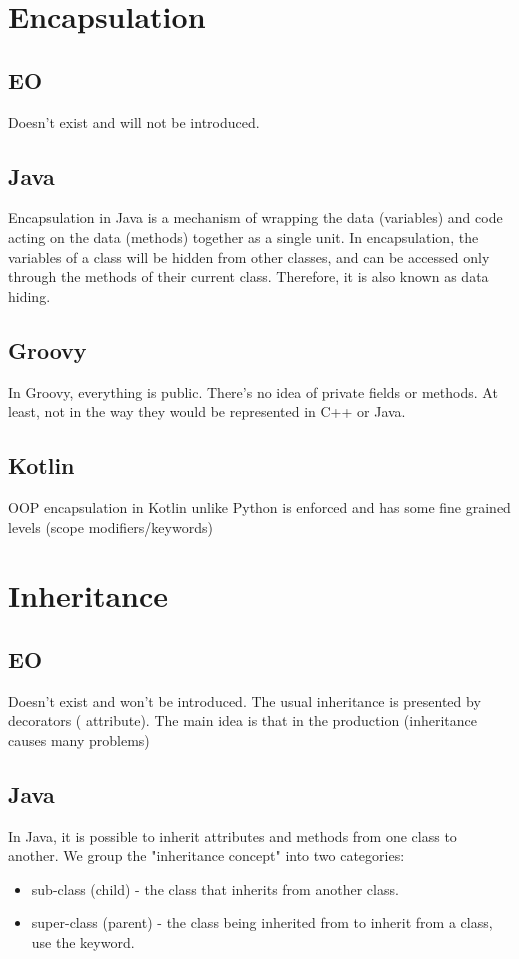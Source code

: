 \documentclass[12pt]{book}
\begin{document}
{{\section{Encapsulation}

\subsection{EO}
Doesn't exist and will not be introduced.

\subsection{Java}
Encapsulation in Java is a mechanism of wrapping  the data (variables) and code acting on the  data (methods) together as a single unit. In encapsulation, the variables of a class will be hidden from other classes, and can be accessed only through the methods of their current class.  Therefore, it is also known as data hiding.

\subsection{Groovy}
In Groovy, everything is public. There’s no idea  of private fields or methods. At least, not in the way they would be represented in C++ or Java.

\subsection{Kotlin}
OOP encapsulation in Kotlin unlike Python is enforced and has some fine grained levels (scope modifiers/keywords)

\section{Inheritance}

\subsection{EO}
Doesn't exist and won't be introduced. The usual inheritance is presented by decorators ( attribute). The main idea is that in the production (inheritance causes  many problems)

\subsection{Java}
In Java, it is possible to inherit attributes and methods from one class to another. We group the "inheritance concept" into two categories:
\begin{itemize}
    \item sub-class (child) - the class that inherits from another class.
    \item super-class (parent) - the class being  inherited from to inherit from a class, use the  keyword.
\end{itemize}

}}
\end{document}
